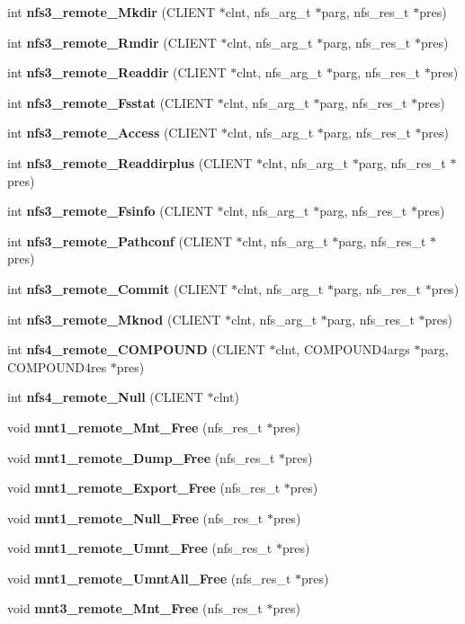\begin{CompactItemize}
\item 
int {\bf nfs3\_\-remote\_\-Mkdir} (CLIENT $\ast$clnt, nfs\_\-arg\_\-t $\ast$parg, nfs\_\-res\_\-t $\ast$pres)
\item 
int {\bf nfs3\_\-remote\_\-Rmdir} (CLIENT $\ast$clnt, nfs\_\-arg\_\-t $\ast$parg, nfs\_\-res\_\-t $\ast$pres)
\item 
int {\bf nfs3\_\-remote\_\-Readdir} (CLIENT $\ast$clnt, nfs\_\-arg\_\-t $\ast$parg, nfs\_\-res\_\-t $\ast$pres)
\item 
int {\bf nfs3\_\-remote\_\-Fsstat} (CLIENT $\ast$clnt, nfs\_\-arg\_\-t $\ast$parg, nfs\_\-res\_\-t $\ast$pres)
\item 
int {\bf nfs3\_\-remote\_\-Access} (CLIENT $\ast$clnt, nfs\_\-arg\_\-t $\ast$parg, nfs\_\-res\_\-t $\ast$pres)
\item 
int {\bf nfs3\_\-remote\_\-Readdirplus} (CLIENT $\ast$clnt, nfs\_\-arg\_\-t $\ast$parg, nfs\_\-res\_\-t $\ast$pres)
\item 
int {\bf nfs3\_\-remote\_\-Fsinfo} (CLIENT $\ast$clnt, nfs\_\-arg\_\-t $\ast$parg, nfs\_\-res\_\-t $\ast$pres)
\item 
int {\bf nfs3\_\-remote\_\-Pathconf} (CLIENT $\ast$clnt, nfs\_\-arg\_\-t $\ast$parg, nfs\_\-res\_\-t $\ast$pres)
\item 
int {\bf nfs3\_\-remote\_\-Commit} (CLIENT $\ast$clnt, nfs\_\-arg\_\-t $\ast$parg, nfs\_\-res\_\-t $\ast$pres)
\item 
int {\bf nfs3\_\-remote\_\-Mknod} (CLIENT $\ast$clnt, nfs\_\-arg\_\-t $\ast$parg, nfs\_\-res\_\-t $\ast$pres)
\item 
int {\bf nfs4\_\-remote\_\-COMPOUND} (CLIENT $\ast$clnt, COMPOUND4args $\ast$parg, COMPOUND4res $\ast$pres)
\item 
int {\bf nfs4\_\-remote\_\-Null} (CLIENT $\ast$clnt)
\item 
void {\bf mnt1\_\-remote\_\-Mnt\_\-Free} (nfs\_\-res\_\-t $\ast$pres)
\item 
void {\bf mnt1\_\-remote\_\-Dump\_\-Free} (nfs\_\-res\_\-t $\ast$pres)
\item 
void {\bf mnt1\_\-remote\_\-Export\_\-Free} (nfs\_\-res\_\-t $\ast$pres)
\item 
void {\bf mnt1\_\-remote\_\-Null\_\-Free} (nfs\_\-res\_\-t $\ast$pres)
\item 
void {\bf mnt1\_\-remote\_\-Umnt\_\-Free} (nfs\_\-res\_\-t $\ast$pres)
\item 
void {\bf mnt1\_\-remote\_\-UmntAll\_\-Free} (nfs\_\-res\_\-t $\ast$pres)
\item 
void {\bf mnt3\_\-remote\_\-Mnt\_\-Free} (nfs\_\-res\_\-t $\ast$pres)

\end{CompactItemize}
